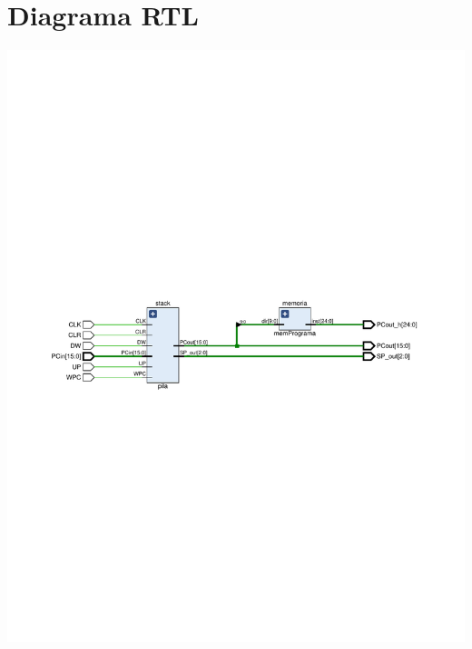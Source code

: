 \documentclass[8pt,executivepaper]{article}
\begin{document}
\section{Diagrama RTL}
\begin{center}
  \includegraphics[scale=0.65]{sources/RTL.pdf}
\end{center}
\end{document}
